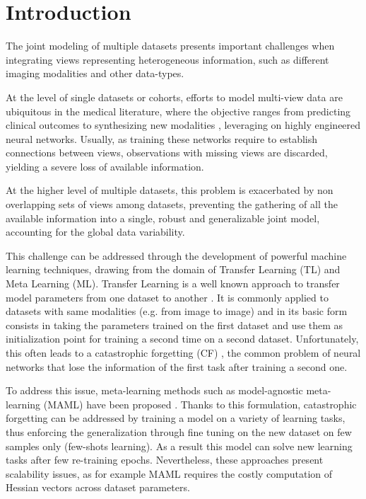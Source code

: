 \section{Introduction}

The joint modeling of multiple datasets presents important challenges when integrating views representing heterogeneous information, such as different imaging modalities and other data-types.

At the level of single datasets or cohorts, efforts to model multi-view data are ubiquitous in the medical literature, where the objective ranges from predicting clinical outcomes \citep{Chen2019} to synthesizing new modalities \citep{Zhou2020, Wei2019}, leveraging on highly engineered neural networks.
Usually, as training these networks require to establish connections between views, observations with missing views are discarded, yielding a severe loss of available information.

At the higher level of multiple datasets, this problem is exacerbated by non overlapping sets of views among datasets, preventing the gathering of all the available information into a single, robust and generalizable joint model, accounting for the global data variability.

This challenge can be addressed through the development of powerful machine learning techniques, drawing from the domain of Transfer Learning (TL) and Meta Learning (ML).
Transfer Learning is a well known approach to transfer model parameters from one dataset to another \citep{TL}.
It is commonly applied to datasets with same modalities (e.g. from image to image) and in its basic form consists in taking the parameters trained on the first dataset and use them as initialization point for training a second time on a second dataset.
Unfortunately, this often leads to a catastrophic forgetting (CF) \citep{CatastroficForgetting}, the common problem of neural networks that lose the information of the first task after training a second one.

To address this issue, meta-learning methods such as model-agnostic meta-learning (MAML) have been proposed \citep{MAML1}.
Thanks to this formulation, catastrophic forgetting can be addressed by training a model on a variety of learning tasks, thus enforcing the generalization through fine tuning on the new dataset on few samples only (few-shots learning).
As a result this model can solve new learning tasks after few re-training epochs.
Nevertheless, these approaches present scalability issues, as for example MAML requires the costly computation of Hessian vectors across dataset parameters.

